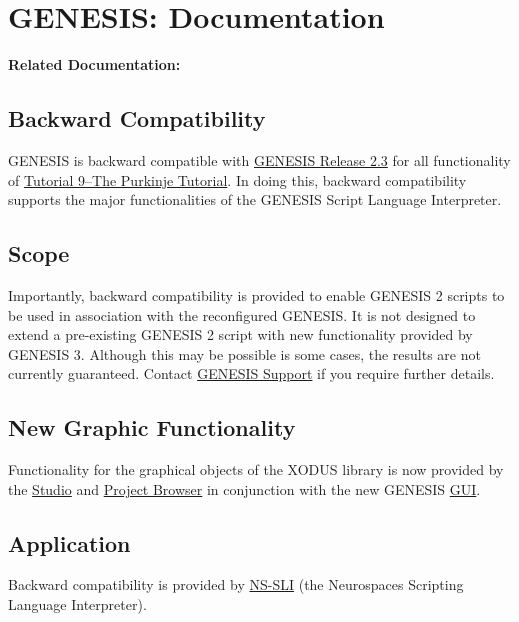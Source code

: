 \documentclass[12pt]{article}
\begin{document}
\section*{GENESIS: Documentation}

{\bf Related Documentation:}

\subsection*{Backward Compatibility}

GENESIS is backward compatible with \href{http://genesis-sim.org/GENESIS/genesis-ftp/}{GENESIS Release 2.3} for all functionality of \href{http://genesis-sim.org/GENESIS/illtuts/purkinje.html}{Tutorial 9--The Purkinje Tutorial}. In doing this, backward compatibility supports the major functionalities of the GENESIS Script Language Interpreter.

\subsection*{Scope}

Importantly, backward compatibility is provided to enable GENESIS 2 scripts to be used in association with the reconfigured GENESIS. It is not designed to extend a pre-existing GENESIS 2 script with new functionality provided by GENESIS 3. Although this may be possible is some cases, the results are not currently guaranteed. Contact \href{http://genesis-sim.org/contact}{GENESIS Support} if you require further details.

\subsection*{New Graphic Functionality}

Functionality for the graphical objects of the XODUS library is now provided by the \href{../studio/studio.tex}{Studio} and \href{../project-browser/project-browser.tex}{Project Browser} in conjunction with the new GENESIS \href{../gtube/gtube.tex}{GUI}.

\subsection*{Application}

Backward compatibility is provided by \href{../ns-sli/ns-sli.tex}{NS-SLI} (the Neurospaces Scripting Language Interpreter).
\end{document}
